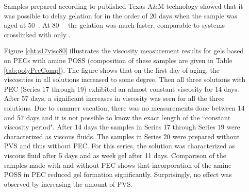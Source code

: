 \documentclass[nanomaterials,article,submit,moreauthors,pdftex]{Definitions/mdpi}
\begin{document}
Samples prepared according to published Texas A\&M technology showed that it was possible to delay gelation for in the order of 20 days when the sample was aged at 50~\celsius. At 80~\celsius~ the gelation was much faster, comparable to systems crosslinked with only .



Figure \ref{cht:s17visc80} illustrates the viscosity measurement results for gels based on PECs with amine POSS (composition of these samples are given in Table \ref{tab:polyPecComp}). The figure shows that on the first day of aging, the viscosities in all solutions increased to some degree. Then all three solutions with PEC (Series 17 through 19) exhibited an almost constant viscosity for 14 days. After 57 days, a significant increases in viscosity was seen for all the three solutions. Due to summer vacation, there was no measurements done between 14 and 57 days and it is not possible to know the exact length of the ``constant viscosity period". After 14 days the samples in Series 17 through Series 19 were characterized as viscous fluids. The samples in Series 20 were prepared without PVS and thus without PEC. For this series, the solution was characterized as viscous fluid after 5 days and as week gel after 11 days. Comparison of the samples made with and without PEC shows that incorporation of the amine POSS in PEC reduced gel formation significantly. Surprisingly, no effect was observed by increasing the amount of PVS.
\end{document}
